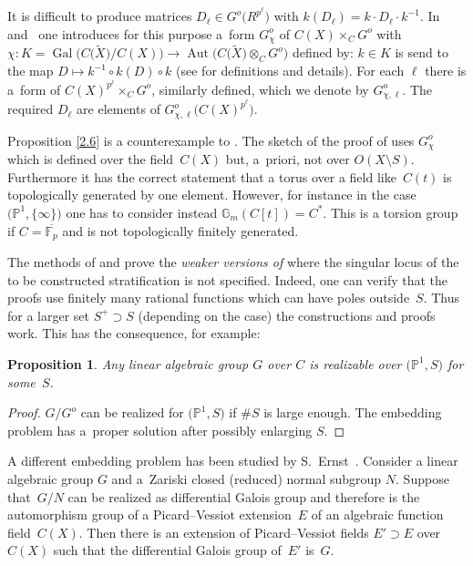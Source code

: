 \documentclass[pdftex]{sigma}
\numberwithin{equation}{section}
\newtheorem{Proposition}[Theorem]{Proposition}
\begin{document}
It is difficult to produce matrices $D_\ell\in G^o\big(R^{p^\ell}\big)$ with $k(D_\ell)=k\cdot D_\ell \cdot k^{-1}$. In~\cite{Ma} and~\cite{Ma-vdP2} one introduces for this purpose a~form $G^o_{\chi}$ of $C(X)\times _CG^o$ with $\chi\colon K=\operatorname{Gal}\big(C\big(\tilde{X}\big)/C(X)\big)\rightarrow \operatorname{Aut}\big(C\big(\tilde{X}\big)\otimes _CG^o\big)$ defined by: $k\in K$ is send to the map $D\mapsto k^{-1}\circ k(D)\circ k$ (see \cite[Section~11.3]{Sp} for definitions and details). For each $\ell$ there is a~form of $C(X)^{p^\ell}\times _CG^o$, similarly defined, which we denote by $G^o_{\chi , \ell}$. The required $D_\ell $ are elements of $G^o_{\chi, \ell}\big(C(X)^{p^\ell}\big)$.

Proposition \ref{2.6} is a counterexample to \cite[Proposition~8.7, Theorems~8.8 and 8.11]{Ma-vdP2}. The sketch of the proof of \cite[Proposition~8.7]{Ma-vdP2} uses $G^o_{\chi}$ which is defined over the field~$C(X)$ but, a~priori, not over $O(X\setminus S)$. Furthermore it has the correct statement that a torus over a field like~$C(t)$ is topologically generated by one element. However, for instance in the case $\big(\mathbb{P}^1,\{\infty \}\big)$ one has to consider instead $\mathbb{G}_m(C[t])=C^*$. This is a torsion group if $C=\overline{\mathbb{F}_p}$ and is not topologically finitely generated.

The methods of \cite[Section~8]{Ma} and \cite[Section~8]{Ma-vdP2} prove the {\it weaker versions of} \cite[Proposition~8.7, Theorems~8.8 and 8.11]{Ma-vdP2} where the singular locus of the to be constructed stratification is not specified. Indeed, one can verify that the proofs use finitely many rational functions which can have poles outside~$S$. Thus for a larger set $S^+\supset S$ (depending on the case) the constructions and proofs work. This has the consequence, for example:
 \begin{Proposition}\label{2.9} Any linear algebraic group $G$ over $C$ is realizable over $\big(\mathbb{P}^1,S\big)$ for some~$S$.
\end{Proposition}
\begin{proof} $G/G^o$ can be realized for $\big(\mathbb{P}^1,S\big)$ if $\#S$ is large enough. The embedding problem has a~proper solution after possibly enlarging $S$.
\end{proof}

A different embedding problem has been studied by S.~Ernst~\cite{Er}. Consider a linear algebraic group $G$ and a~Zariski closed (reduced) normal subgroup $N$. Suppose that~$G/N$ can be realized as differential Galois group and therefore is the automorphism group of a Picard--Vessiot extension~$E$ of an algebraic function field~$C(X)$. Then there is an extension of Picard--Vessiot fields $E'\supset E$ over $C(X)$ such that the differential Galois group of~$E'$ is~$G$.
\end{document}

